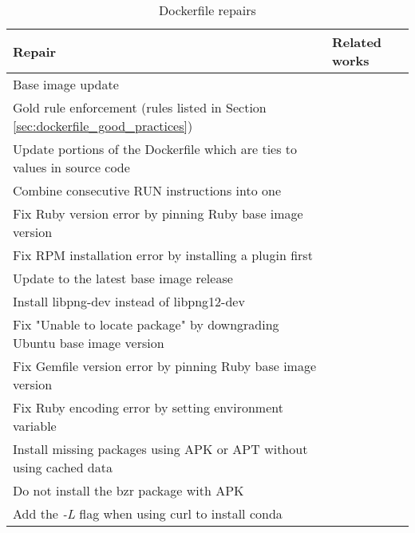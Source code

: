 \begin{table}[H]
    \centering
    \begin{tabular}{|p{}|p{}|}
        \hline \textbf{Repair} & \textbf{Related works} \\
        \hline Base image update & \cite{kitajimaLatestImageRecommendation2020} \\
        \hline Gold rule enforcement (rules listed in Section \ref{sec:dockerfile_good_practices}) & \cite{henkelLearningUnderstandingSupporting2020} \\
        \hline Update portions of the Dockerfile which are ties to values in source code & \cite{hassanRUDSEARecommendingUpdates2018} \\
        \hline Combine consecutive RUN instructions into one & \cite{benniSupportingMicroservicesDeployment2018} \\
        \hline Fix Ruby version error by pinning Ruby base image version & \cite{henkelShipwrightHumanintheLoopSystem2021} \\
        \hline Fix RPM installation error by installing a plugin first & \cite{henkelShipwrightHumanintheLoopSystem2021} \\
        \hline Update to the latest base image release & \cite{henkelShipwrightHumanintheLoopSystem2021} \\
        \hline Install libpng-dev instead of libpng12-dev & \cite{henkelShipwrightHumanintheLoopSystem2021} \\
        \hline Fix "Unable to locate package" by downgrading Ubuntu base image version & \cite{henkelShipwrightHumanintheLoopSystem2021} \\
        \hline Fix Gemfile version error by pinning Ruby base image version & \cite{henkelShipwrightHumanintheLoopSystem2021} \\
        \hline Fix Ruby encoding error by setting environment variable & \cite{henkelShipwrightHumanintheLoopSystem2021} \\
        \hline Install missing packages using APK or APT without using cached data & \cite{henkelShipwrightHumanintheLoopSystem2021} \\
        \hline Do not install the bzr package with APK & \cite{henkelShipwrightHumanintheLoopSystem2021} \\
        \hline Add the \textit{-L} flag when using curl to install conda & \cite{henkelShipwrightHumanintheLoopSystem2021} \\
        \hline
    \end{tabular}
    \caption{Dockerfile repairs}
    \label{tab:dockerfile_repair}
\end{table}

